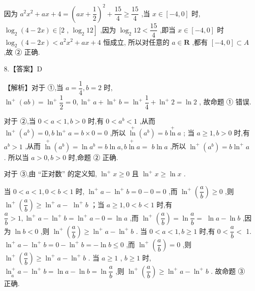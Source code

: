 \documentclass[10pt]{article}
\begin{document}
因为 ${a}^{2}{x}^{2} + {ax} + 4 = {\left( ax + \dfrac{1}{2}\right) }^{2} + \dfrac{15}{4} \geq  \dfrac{15}{4}$ ,当 $x \in  \left\lbrack  {-4,0}\right\rbrack$ 时, ${\log }_{2}\left( {4 - {2x}}\right)  \in  \lbrack 2$ , $\left. {{\log }_{2}{12}}\right\rbrack$ ,因为 ${\log }_{2}{12} < \dfrac{15}{4}$ ,即当 $x \in  \left\lbrack  {-4,0}\right\rbrack$ 时 ${\log }_{2}\left( {4 - {2x}}\right)  < {a}^{2}{x}^{2} + {ax} + 4$ 恒成立, 所以对任意的 $a \in  \mathbf{R}$ ,都有 $\left\lbrack  {-4,0}\right\rbrack   \subset  A$ ,故 ② 正确.

8.【答案】D

【解析】对于 ①,当 $a = \dfrac{1}{4},b = 2$ 时, ${\ln }^{ + }\left( {ab}\right)  = {\ln }^{ + }\dfrac{1}{2} = 0,{\ln }^{ + }a + {\ln }^{ + }b = {\ln }^{ + }\dfrac{1}{4} + {\ln }^{ + }2 = \ln 2$ , 故命题 ① 错误.

对于 ②,当 $0 < a < 1,b > 0$ 时,有 $0 < {a}^{b} < 1$ ,从而 ${\ln }^{ + }\left( {a}^{b}\right)  = 0,b{\ln }^{ + }a = b \times  0 = 0$ ,所以 $\mathop{\ln }\limits^{ + }\left( {a}^{b}\right)  = b\mathop{\ln }\limits^{ + }a$ ; 当 $a \geq  1,b > 0$ 时,有 ${a}^{b} > 1$ ,从而 $\mathop{\ln }\limits^{ + }\left( {a}^{b}\right)  = \ln {a}^{b} = b\ln a,b\mathop{\ln }\limits^{ + }a =$  $b\ln a$ ,所以 ${\ln }^{ + }\left( {a}^{b}\right)  = b{\ln }^{ + }a$ . 所以当 $a > 0,b > 0$ 时,命题 ② 正确.

对于 ③,由 “正对数” 的定义知, ${\ln }^{ + }x \geq  0$ 且 ${\ln }^{ + }x \geq  \ln x$ .

当 $0 < a < 1,0 < b < 1$ 时, ${\ln }^{ + }a - {\ln }^{ + }b = 0 - 0 = 0$ ,而 ${\ln }^{ + }\left( \dfrac{a}{b}\right)  \geq  0$ ,则 ${\ln }^{ + }\left( \dfrac{a}{b}\right)  \geq  {\ln }^{ + }a -$  ${\ln }^{ + }b$ ；当 $a \geq  1,0 < b < 1$ 时,有 $\dfrac{a}{b} > 1,{\ln }^{ + }a - {\ln }^{ + }b = {\ln }^{ + }a - 0 = \ln a$ ,而 ${\ln }^{ + }\left( \dfrac{a}{b}\right)  = \ln \dfrac{a}{b} =$  $\ln a - \ln b$ ,因为 $\ln b < 0$ ,则 ${\ln }^{ + }\left( \dfrac{a}{b}\right)  \geq  {\ln }^{ + }a - {\ln }^{ + }b$ . 当 $0 < a < 1,b \geq  1$ 时,有 $0 < \dfrac{a}{b} <$ 1. ${\ln }^{ + }a - {\ln }^{ + }b = 0 - {\ln }^{ + }b =  - \ln b \leq  0$ ,而 ${\ln }^{ + }\left( \dfrac{a}{b}\right)  = 0$ ,则 ${\ln }^{ + }\left( \dfrac{a}{b}\right)  \geq  {\ln }^{ + }a - {\ln }^{ + }b$ . 当 $a \geq  1$ , $b \geq  1$ 时, $\underset{a}{{\ln }^{ + }a} - {\ln }^{ + }b = \ln a - \ln b = \ln \dfrac{a}{b}$ ,则 ${\ln }^{ + }\left( \dfrac{a}{b}\right)  \geq  {\ln }^{ + }a - {\ln }^{ + }b$ . 故命题 ③ 正确.
\end{document}
